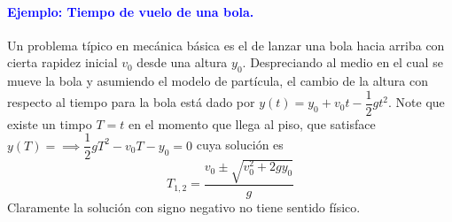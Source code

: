 \documentclass[12pt]{article}
\begin{document}
\paragraph{\textcolor{blue}{Ejemplo: Tiempo de vuelo de una bola.}} 
Un problema típico en mecánica básica es el de lanzar una bola hacia 
arriba con cierta rapidez inicial $v_0$ desde una altura $y_0$. 
Despreciando al medio en el cual se mueve la bola y asumiendo el modelo 
de partícula, el cambio de la altura con respecto al tiempo para la bola está
dado por $y(t) = y_0 + v_0 t -\dfrac{1}{2} gt^2$.  
Note que existe un timpo $T = t$  en el momento que llega al piso, que satisface
$y(T) = \implies  \dfrac{1}{2} gT^2  - v_0 T - y_0= 0 $ cuya solución es 
$$ T_{1,2} = \dfrac{v_0 \pm \sqrt{v_0^2 + 2gy_0}}{g}$$
Claramente la solución con signo negativo no tiene sentido físico.
\end{document}
